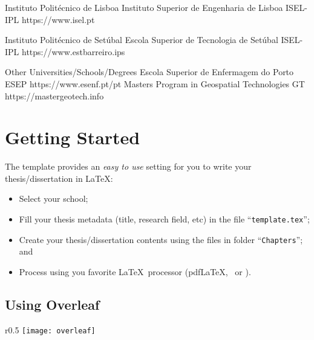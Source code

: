 \begin{ntUnivesity}{Instituto Politécnico de Lisboa}
             {Instituto Superior de Engenharia de Lisboa}%
             {ISEL-IPL}%
             {https://www.isel.pt}%
\end{ntUnivesity}

\begin{ntUnivesity}{Instituto Politécnico de Setúbal}
             {Escola Superior de Tecnologia de Setúbal}%
             {ISEL-IPL}%
             {https://www.estbarreiro.ips}%
\end{ntUnivesity}

\begin{ntUnivesity}{Other Universities/Schools/Degrees}
             {Escola Superior de Enfermagem do Porto}%
             {ESEP}%
             {https://www.esenf.pt/pt}%
             {Masters Program in Geospatial Technologies}%
             {GT}%
             {https://mastergeotech.info}%
\end{ntUnivesity}


\section{Getting Started}
\label{sec:getting_started}

The template provides an \emph{easy to use} setting for you to write your thesis/dissertation in \LaTeX:
\begin{itemize}
  \item  Select your school;
  \item Fill your thesis metadata (title, research field, etc) in the file “\texttt{template.tex}”;
  \item Create your thesis/dissertation contents using the files in folder “\texttt{Chapters}”; and
  \item Process using you favorite \LaTeX\ processor (pdf\LaTeX, \XeLaTeX\ or \LuaLaTeX).
\end{itemize}

\subsection{Using Overleaf}
\label{sub:using_overleaf}

\begin{wrapfigure}{r}{0.5\linewidth}
\vspace*{-15ex}\texttt{[image: overleaf]}%
\end{wrapfigure}

